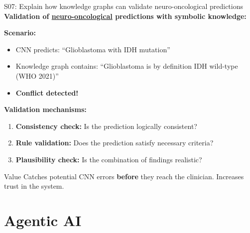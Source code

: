 \documentclass[aspectratio=169, 10pt]{beamer}
\begin{document}
\begin{frame}{S07: Explain how knowledge graphs can validate neuro-oncological predictions}
    \textbf{Validation of \href{https://en.wikipedia.org/wiki/Neuro-oncology}{neuro-oncological} predictions with symbolic knowledge:}
    
    \vspace{0.2cm}
    \textbf{Scenario:}
    \begin{itemize}
        \item CNN predicts: ``Glioblastoma with IDH mutation''
        \item Knowledge graph contains: ``Glioblastoma is by definition IDH wild-type (WHO 2021)''
        \item \textbf{Conflict detected!}
    \end{itemize}
    
    \vspace{0.15cm}
    \textbf{Validation mechanisms:}
    \begin{enumerate}
        \item \textbf{Consistency check:} Is the prediction logically consistent?
        \item \textbf{Rule validation:} Does the prediction satisfy necessary criteria?
        \item \textbf{Plausibility check:} Is the combination of findings realistic?
    \end{enumerate}
    
    {\small
    \begin{alertblock}{Value}
        Catches potential CNN errors \textbf{before} they reach the clinician. Increases trust in the system.
    \end{alertblock}
    }
\end{frame}

\section{Agentic AI}
\end{document}
